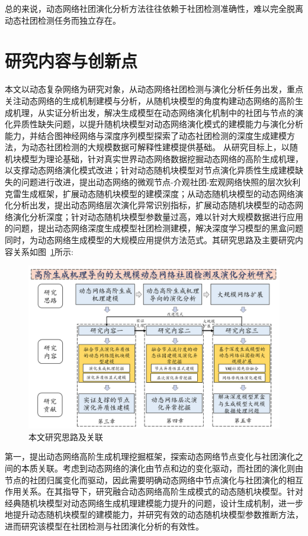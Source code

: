 总的来说，动态网络社团演化分析方法往往依赖于社团检测准确性，难以完全脱离动态社团检测任务而独立存在。

\section{研究内容与创新点}

本文以动态复杂网络为研究对象，从动态网络社团检测与演化分析任务出发，重点关注动态网络的生成机制建模与分析，从随机块模型的角度构建动态网络的高阶生成机理，从实证分析出发，解决生成模型在动态网络演化机制中的社团与节点的演化异质性缺失问题，以提升随机块模型对动态网络演化模式的建模能力与演化分析能力，并结合图神经网络与深度序列模型探索了动态社团检测的深度生成建模方法，为动态社团检测的大规模数据可解释性建模提供基础。
从研究目标上，以随机块模型为理论基础，针对真实世界动态网络数据挖掘动态网络的高阶生成机理，以支撑动态网络演化模式改进；针对动态随机块模型对节点演化异质性生成建模缺失的问题进行改进，提出动态网络的微观节点-介观社团-宏观网络快照的层次狄利克雷生成框架，扩展动态随机块模型的建模深度；从动态随机块模型的动态网络演化分析出发，提出动态网络层次演化异常识别指标，扩展动态随机块模型的动态网络演化分析深度；针对动态随机块模型参数量过高，难以针对大规模数据进行应用的问题，提出动态网络深度生成模型社团检测建模，解决深度学习模型的黑盒问题同时，为动态网络生成模型的大规模应用提供方法范式。其研究思路及主要研究内容关系如图~\ref{chap1:fig:framework}所示:
\begin{figure}
    \centering
    \includegraphics[width=.75\linewidth]{figures/chap01/framework.png}
    \caption{本文研究思路及关联}
    \label{chap1:fig:framework}
\end{figure}

第一，提出动态网络高阶生成机理挖掘框架，探索动态网络节点变化与社团演化之间的本质关联。考虑到动态网络的演化由节点和边的变化驱动，而社团的演化则由节点的社团归属变化而驱动，因此需要明确动态网络中节点演化与社团演化的相互作用关系。在其指导下，研究融合动态网络高阶生成模式的动态随机块模型。针对经典随机块模型对动态网络生成机理建模能力提升的问题，设计生成机制，进一步地提升动态随机块模型的建模能力，并研究有效的动态随机块模型参数推断方法，进而研究该模型在社团检测与社团演化分析的有效性。

